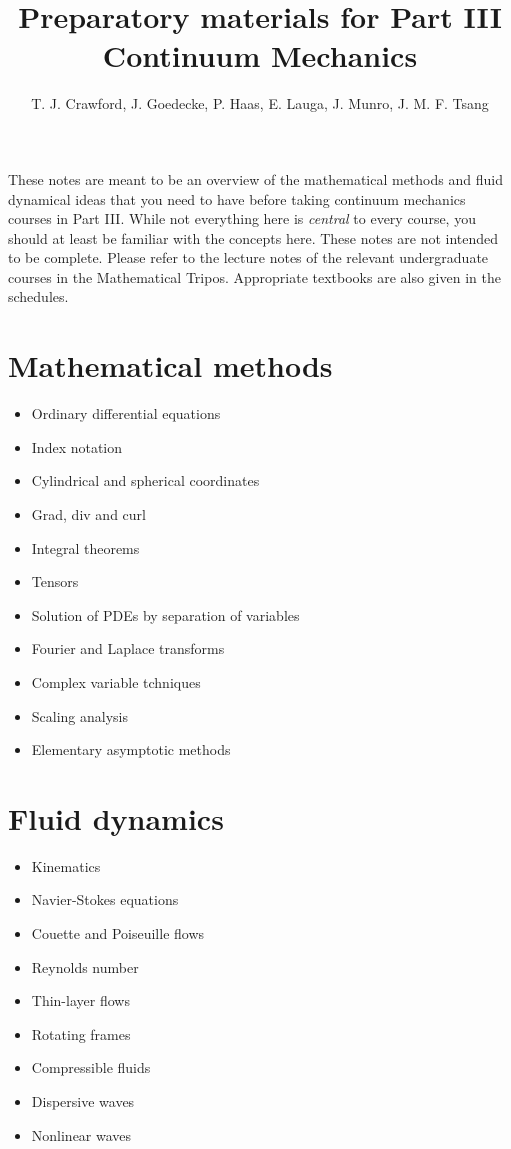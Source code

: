 \documentclass{article}
\title{Preparatory materials for Part III Continuum Mechanics}
\author{T. J. Crawford, J. Goedecke, P. Haas, E. Lauga, J. Munro, J. M. F. Tsang}
\begin{document}
\maketitle

These notes are meant to be an overview of the mathematical methods and fluid
dynamical ideas that you need to have before taking continuum mechanics courses
in Part III. While not everything here is \textit{central} to every course, you
should at least be familiar with the concepts here.
These notes are not intended to be complete. Please refer to the lecture notes
of the relevant undergraduate courses in the Mathematical Tripos. Appropriate
textbooks are also given in the schedules. 

\section{Mathematical methods}
\begin{itemize}
    \item Ordinary differential equations
    \item Index notation
\item{Cylindrical and spherical coordinates}
\item{Grad, div and curl}
\item{Integral theorems}
\item{Tensors}
\item{Solution of PDEs by separation of variables}
\item{Fourier and Laplace transforms}
\item{Complex variable tchniques}
\item{Scaling analysis}
\item{Elementary asymptotic methods}
\end{itemize}

\section{Fluid dynamics}
\begin{itemize}
\item{Kinematics}
\item{Navier-Stokes equations}
\item{Couette and Poiseuille flows}
\item{Reynolds number}
\item{Thin-layer flows}
\item{Rotating frames}
\item{Compressible fluids}
\item{Dispersive waves}
\item{Nonlinear waves}
\end{itemize}
\end{document}
